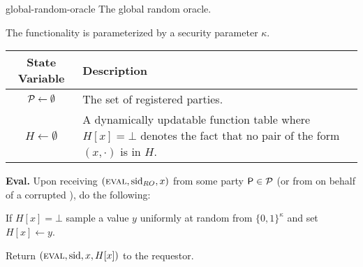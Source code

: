 \begin{cccFunctionality}
    {\funcGRO}
    {global-random-oracle}
    {The global random oracle.}

    The functionality is parameterized by a security parameter $\kappa$.

    \begin{tabularx}{.9\textwidth}{c  X}
        \toprule[.3mm]
        \textbf{State Variable}
         & \textbf{Description}
        \\ \midrule[.3mm]
        $\mathcal{P} \gets \emptyset$
         & The set of registered parties.
        \\ \midrule
        $H \gets \emptyset$
         & A dynamically updatable function table where $H[x] = \bot$ denotes the fact that no pair of the form $(x, \cdot)$ is in $H$.
        \\ \bottomrule[.3mm]
    \end{tabularx}
    \addtocounter{table}{-1}

    \begin{cccItemize}[noitemsep]
        \item \textbf{Eval.} Upon receiving $(\textsc{eval}, \mathrm{sid}_{RO}, x)$ from some party $\mathsf{P} \in \mathcal{P}$ (or from \adv on behalf of a corrupted \party), do the following:
        \begin{cccEnum}[nosep]
            \item If $H[x] = \bot$ sample a value $y$ uniformly at random from $\{0, 1\}^\kappa$ and set $H[x] \gets y$.
            \item Return $(\textsc{eval}, \mathrm{sid}, x, H[x])$ to the requestor.
        \end{cccEnum}
    \end{cccItemize}
\end{cccFunctionality}